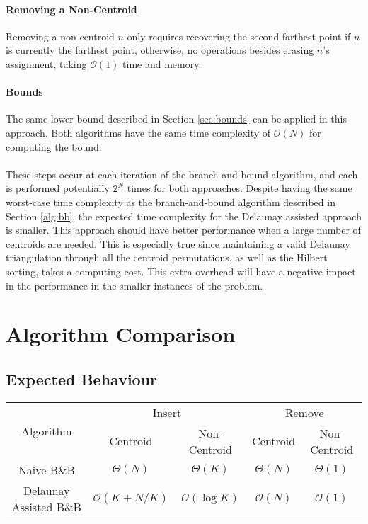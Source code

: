 \paragraph{Removing a Non-Centroid}
Removing a non-centroid $n$ only requires recovering the second farthest point if $n$ is currently the farthest point, otherwise, no operations besides erasing $n$'s assignment, taking $\mathcal{O}(1)$ time and memory.
\paragraph{Bounds}
The same lower bound described in Section \ref{sec:bounds} can be applied in this approach. Both algorithms have the same time complexity of $\mathcal{O}(N)$ for computing the bound.


\paragraph{}
These steps occur at each iteration of the branch-and-bound algorithm, and each is performed potentially $2^N$ times for both approaches.
Despite having the same worst-case time complexity as the branch-and-bound algorithm described in Section \ref{alg:bb}, the expected time complexity for the Delaunay assisted approach is smaller. This approach should have better performance when a large number of centroids are needed.
This is especially true since maintaining a valid Delaunay triangulation through all the centroid permutations, as well as the Hilbert sorting, takes a computing cost. This extra overhead will have a negative impact in the performance in the smaller instances of the problem.

\section{Algorithm Comparison}

\subsection{Expected Behaviour}

\begin{center}
\begin{tabular}{|c|c|c|c|c|}
	\hline
	\multirow{2}{*}{Algorithm}	& \multicolumn{2}{c|}{Insert}	& \multicolumn{2}{c|}{Remove}	\\ \cline{2-5}
								& Centroid		& Non-Centroid	& Centroid		& Non-Centroid	\\ \hline
		Naive B\&B		& $\Theta(N)$ & $\Theta(K)$ 
									& $\Theta(N)$ & $\Theta(1)$ \\ \hline
		Delaunay Assisted B\&B		& $\mathcal{O}(K+N/K)$& $\mathcal{O}(\log{K})$
									& $\mathcal{O}(N)$ & $\mathcal{O}(1)$\\ \hline
\end{tabular}
\end{center}

